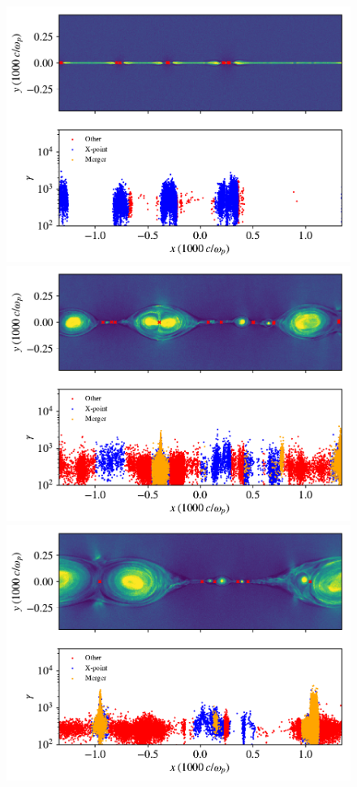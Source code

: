 \documentclass[iop,twocolappendix]{emulateapj}
\begin{document}
\begin{figure}[!h]
	{
		\includegraphics[width=\linewidth]{bguide1_untriggered_snap7.pdf}
	}
	\newline
	{
		\includegraphics[width=\linewidth]{bguide1_untriggered_snap20.pdf}
	}
	\newline
	{
		\includegraphics[width=\linewidth]{bguide1_untriggered_snap30.pdf}
	}
	

\end{figure}
\end{document}
